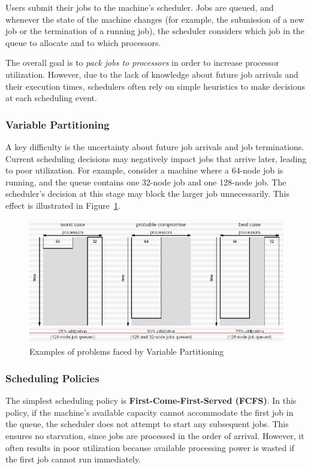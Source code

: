 \documentclass[12pt]{book}
\begin{document}
Users submit their jobs to the machine's scheduler. Jobs are queued, and whenever the state of the machine changes (for example, the submission of a new job or the termination of a running job), the scheduler considers which job in the queue to allocate and to which processors.

The overall goal is to \emph{pack jobs to processors} in order to increase processor utilization. However, due to the lack of knowledge about future job arrivals and their execution times, schedulers often rely on simple heuristics to make decisions at each scheduling event.

\subsubsection{Variable Partitioning}
A key difficulty is the uncertainty about future job arrivals and job terminations. Current scheduling decisions may negatively impact jobs that arrive later, leading to poor utilization. For example, consider a machine where a 64-node job is running, and the queue contains one 32-node job and one 128-node job. The scheduler's decision at this stage may block the larger job unnecessarily. This effect is illustrated in Figure~\ref{fig:variable-partitioning}.
\begin{figure}[ht]
    \centering
    \includegraphics[width=0.75\linewidth]{images/variableparti.png}
    \caption{Examples of problems faced by Variable Partitioning}
    \label{fig:variable-partitioning}
\end{figure}
\subsubsection{Scheduling Policies}
The simplest scheduling policy is \textbf{First-Come-First-Served (FCFS)}. In this policy, if the machine's available capacity cannot accommodate the first job in the queue, the scheduler does not attempt to start any subsequent jobs. This ensures no starvation, since jobs are processed in the order of arrival. However, it often results in poor utilization because available processing power is wasted if the first job cannot run immediately.
\end{document}

